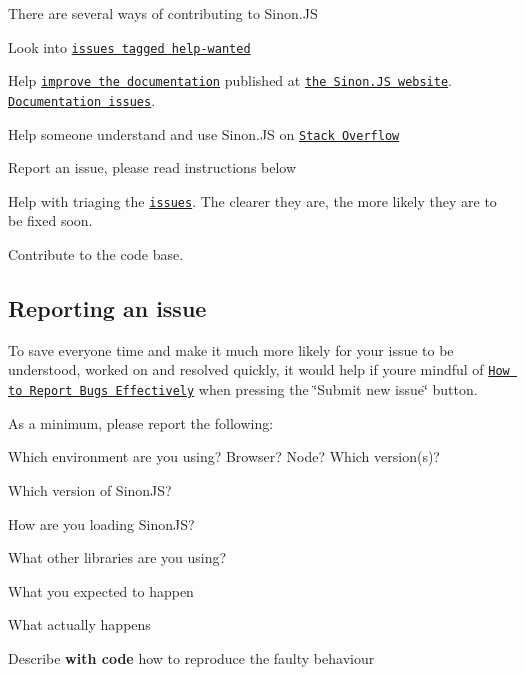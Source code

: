 There are several ways of contributing to Sinon.\+JS


\begin{DoxyItemize}
\item Look into \href{https://github.com/sinonjs/sinon/issues?q=is%3Aopen+is%3Aissue+label%3A%22Help+wanted%22}{\tt issues tagged {\ttfamily help-\/wanted}}
\item Help \href{https://github.com/sinonjs/sinon/tree/master/docs}{\tt improve the documentation} published at \href{https://sinonjs.org}{\tt the Sinon.\+JS website}. \href{https://github.com/sinonjs/sinon/issues?q=is%3Aopen+is%3Aissue+label%3ADocumentation}{\tt Documentation issues}.
\item Help someone understand and use Sinon.\+JS on \href{https://stackoverflow.com/questions/tagged/sinon}{\tt Stack Overflow}
\item Report an issue, please read instructions below
\item Help with triaging the \href{https://github.com/sinonjs/sinon/issues}{\tt issues}. The clearer they are, the more likely they are to be fixed soon.
\item Contribute to the code base.
\end{DoxyItemize}

\subsection*{Reporting an issue}

To save everyone time and make it much more likely for your issue to be understood, worked on and resolved quickly, it would help if you\textquotesingle{}re mindful of \href{http://www.chiark.greenend.org.uk/~sgtatham/bugs.html}{\tt How to Report Bugs Effectively} when pressing the \char`\"{}\+Submit new issue\char`\"{} button.

As a minimum, please report the following\+:


\begin{DoxyItemize}
\item Which environment are you using? Browser? Node? Which version(s)?
\item Which version of Sinon\+JS?
\item How are you loading Sinon\+JS?
\item What other libraries are you using?
\item What you expected to happen
\item What actually happens
\item Describe {\bfseries with code} how to reproduce the faulty behaviour
\end{DoxyItemize}

